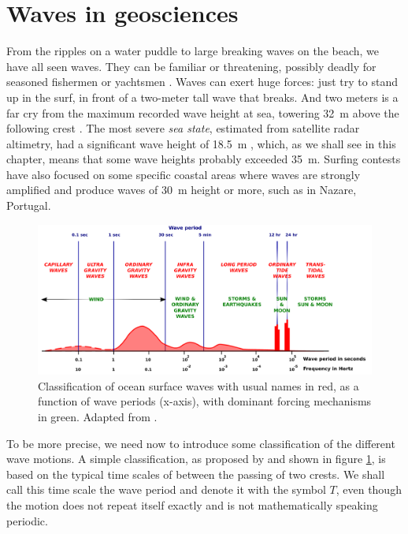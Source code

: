 \section{Waves in geosciences}
From the ripples on a water puddle to large breaking waves on the beach, we have all seen waves. 
They can be familiar or threatening, possibly deadly for seasoned fishermen or yachtsmen 
\citep[e. g. ][]{Pierson1972,Greenslade2001b}. Waves can exert huge forces: just try to stand up in the surf,
in front of a two-meter tall wave that breaks. And two meters is a far cry from the maximum recorded wave height at sea, towering
32~m above the following crest \citep{Liu&al.2008b}. The most severe \textit{sea state}, estimated from satellite radar altimetry, had a significant 
wave height of 18.5~m \citep{Hanafin&al.2012,DeCarlo&Ardhuin2024}, which, as we shall see in this chapter, 
means that some wave heights probably exceeded 35~m. Surfing contests have also focused on some specific coastal areas where waves are strongly amplified and produce waves of 30~m height or more, such as in Nazare, Portugal.



\begin{figure}[htb]
\centerline{\includegraphics[width=\textwidth]{FIGS_CH_INTRO/Munk_ICCE_1950_Fig1.pdf}}
  \caption{Classification of ocean surface waves with usual names in red, as a function of wave periods (x-axis), with dominant forcing mechanisms in green. Adapted from \cite{Munk1950}.}
\label{fig:Munk1950}
\end{figure}
To be more precise, we need now to introduce some classification of the different wave motions. A simple classification, as proposed by 
\cite{Munk1950} and shown in figure \ref{fig:Munk1950}, is based on the typical time scales of between the passing of two crests. We shall call this time scale the wave period and denote it with the symbol $T$, even though the motion does not repeat itself exactly and is not mathematically speaking periodic. 

